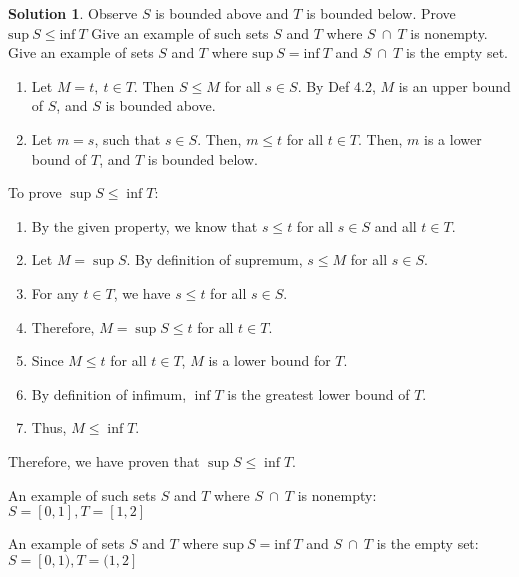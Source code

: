 \documentclass[12pt]{article}
\theoremstyle{definition} %
\newtheorem{solution}{Solution}
\theoremstyle{plain} %
\begin{document}
  \begin{solution}
           Observe $S$ is bounded above and $T$ is bounded below.
           Prove $\text{sup}\ S \leq \text{inf}\ T$
           Give an example of such sets $S$ and $T$ where $S \ \cap \ T$ is nonempty.
           Give an example of sets $S$ and $T$ where $\text{sup}\ S = \text{inf}\ T$ and $S \ \cap \ T$ is the empty set.
  
      
  
          \begin{enumerate}
              \item Let $M=t,\ t \in T$. Then $S\leq M$ for all $s\in S$. By Def 4.2, $M$ is an upper bound of $S$, and $S$ is bounded above.
              \item Let $m=s$, such that $s\in S$. Then, $m\leq t$ for all $t \in T$. Then, $m$ is a lower bound of $T$, and $T$ is bounded below.
          \end{enumerate}
          
       To prove $\sup S \leq \inf T$:
          \begin{enumerate}
              \item By the given property, we know that $s \leq t$ for all $s \in S$ and all $t \in T$.
              \item Let $M = \sup S$. By definition of supremum, $s \leq M$ for all $s \in S$.
              \item For any $t \in T$, we have $s \leq t$ for all $s \in S$.
              \item Therefore, $M = \sup S \leq t$ for all $t \in T$.
              \item Since $M \leq t$ for all $t \in T$, $M$ is a lower bound for $T$.
              \item By definition of infimum, $\inf T$ is the greatest lower bound of $T$.
              \item Thus, $M \leq \inf T$.
          \end{enumerate}
          Therefore, we have proven that $\sup S \leq \inf T$. 
      
          
           An example of such sets $S$ and $T$ where $S \ \cap \ T$ is nonempty: $S=[0,1], T=[1,2]$
          
         An example of sets $S$ and $T$ where $\text{sup}\ S = \text{inf}\ T$ and $S \ \cap \ T$ is the empty set: $S=[0,1), T=(1,2]$
      
  \end{solution}
  
\end{document}
